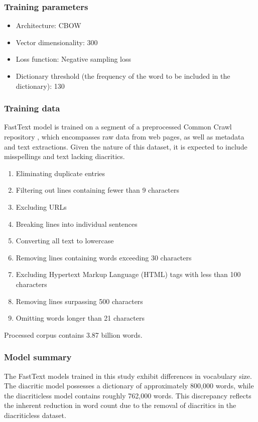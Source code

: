 \subsubsection{Training parameters}
\begin{itemize}
  \item Architecture: \ac{CBOW} 
  \item Vector dimensionality: 300
  \item Loss function: Negative sampling loss
  \item Dictionary threshold (the frequency of the word to be included in the dictionary): 130
\end{itemize}

\subsubsection{Training data}

FastText model is trained on a segment of a preprocessed Common Crawl repository \cite{commoncrawl}, which encompasses raw data from web pages, as well as metadata and text extractions.
Given the nature of this dataset, it is expected to include misspellings and text lacking diacritics.

\begin{enumerate}
  \item Eliminating duplicate entries
  \item Filtering out lines containing fewer than 9 characters
  \item Excluding URLs
  \item Breaking lines into individual sentences
  \item Converting all text to lowercase
  \item Removing lines containing words exceeding 30 characters
  \item Excluding Hypertext Markup Language (HTML) tags with less than 100 characters
  \item Removing lines surpassing 500 characters
  \item Omitting words longer than 21 characters
\end{enumerate}

Processed corpus contains 3.87 billion words.

\subsubsection{Model summary}

The FastText models trained in this study exhibit differences in vocabulary size.
The diacritic model possesses a dictionary of approximately 800,000 words, while the diacriticless model contains roughly 762,000 words.
This discrepancy reflects the inherent reduction in word count due to the removal of diacritics in the diacriticless dataset.

